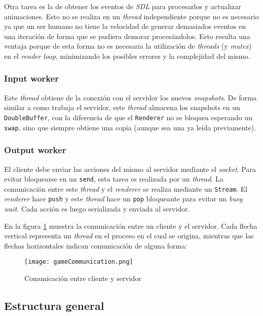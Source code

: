 Otra tarea es la de obtener los eventos de \textit{SDL} para procesarlos y actualizar animaciones. Esto no se realiza
en un \textit{thread} independiente porque no es necesario ya que un ser humano no tiene la velocidad de generar demasiados
eventos en una iteración de forma que se pudiera demorar proces\'andolos. Esto resulta una ventaja porque de esta
forma no es necesaria la utilizaci\'on de \textit{threads} (y \textit{mutex}) en el \textit{render loop}, minimizando los posibles errores
y la complejidad del mismo.


\subsubsection{Input worker}

Este \textit{thread} obtiene de la conexi\'on con el servidor los nuevos \textit{snapshots}. De forma similar a como trabaja el servidor,
este \textit{thread} almacena los snapshots en un \texttt{DoubleBuffer}, con la diferencia de que el \texttt{Renderer} no
se bloquea esperando un \texttt{swap}, sino que siempre obtiene una copia (aunque sea una ya leída previamente).


\subsubsection{Output worker}

El cliente debe enviar las acciones del mismo al servidor mediante el \textit{socket}. Para evitar bloquearse en un \texttt{send},
esta tarea es realizada por un \textit{thread}. La comunicaci\'on entre este \textit{thread} y el \textit{renderer} se realiza mediante un
\texttt{Stream}. El \textit{renderer} hace \texttt{push} y este \textit{thread} hace un \texttt{pop} bloqueante para evitar un \textit{busy wait}.
Cada acci\'on es luego serializada y enviada al servidor.


En la figura \ref{im:comunicacion} muestra la comunicaci\'on entre un cliente y el servidor. Cada flecha vertical representa un \textit{thread}
en el proceso en el cual se origina, mientras que las flechas horizontales indican comunicaci\'on de alguna forma:

\begin{figure}[H]
	\centering
	\texttt{[image: gameCommunication.png]}
	\caption{Comunicación entre cliente y servidor}
	\label{im:comunicacion}
\end{figure}


\subsection{Estructura general}

